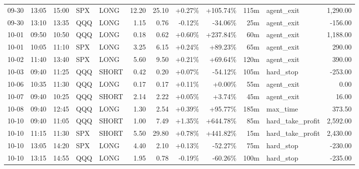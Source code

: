 \documentclass[11pt,a4paper,twoside]{article}
\begin{document}
\begin{center}
\begin{longtable}{>{\color{txtmain}}l l l l l r r r r r >{\color{txtmain}}l r}
09-30 & 13:05 & 15:00 & SPX & LONG & 12.20 & 25.10 & \textcolor{wingreen}{+0.27\%} & \textcolor{wingreen}{+105.74\%} & 115m & agent\_exit & \textcolor{wingreen}{1,290.00} \\
09-30 & 13:10 & 13:35 & QQQ & LONG & 1.15 & 0.76 & \textcolor{lossred}{-0.12\%} & \textcolor{lossred}{-34.06\%} & 25m & agent\_exit & \textcolor{lossred}{-156.00} \\
10-01 & 09:50 & 10:50 & QQQ & LONG & 0.18 & 0.62 & \textcolor{wingreen}{+0.60\%} & \textcolor{wingreen}{+237.84\%} & 60m & agent\_exit & \textcolor{wingreen}{1,188.00} \\
10-01 & 10:05 & 11:10 & SPX & LONG & 3.25 & 6.15 & \textcolor{wingreen}{+0.24\%} & \textcolor{wingreen}{+89.23\%} & 65m & agent\_exit & \textcolor{wingreen}{290.00} \\
10-02 & 11:40 & 13:40 & SPX & LONG & 5.60 & 9.50 & \textcolor{wingreen}{+0.21\%} & \textcolor{wingreen}{+69.64\%} & 120m & agent\_exit & \textcolor{wingreen}{390.00} \\
10-03 & 09:40 & 11:25 & QQQ & SHORT & 0.42 & 0.20 & \textcolor{wingreen}{+0.07\%} & \textcolor{lossred}{-54.12\%} & 105m & hard\_stop & \textcolor{lossred}{-253.00} \\
10-06 & 10:35 & 11:30 & QQQ & LONG & 0.17 & 0.17 & \textcolor{wingreen}{+0.11\%} & \textcolor{wingreen}{+0.00\%} & 55m & agent\_exit & \textcolor{wingreen}{0.00} \\
10-07 & 09:40 & 10:25 & QQQ & SHORT & 2.14 & 2.22 & \textcolor{wingreen}{+0.05\%} & \textcolor{wingreen}{+3.74\%} & 45m & agent\_exit & \textcolor{wingreen}{16.00} \\
10-08 & 09:40 & 12:45 & QQQ & LONG & 1.30 & 2.54 & \textcolor{wingreen}{+0.39\%} & \textcolor{wingreen}{+95.77\%} & 185m & max\_time & \textcolor{wingreen}{373.50} \\
10-10 & 09:40 & 11:05 & QQQ & SHORT & 1.00 & 7.49 & \textcolor{wingreen}{+1.35\%} & \textcolor{wingreen}{+644.78\%} & 85m & hard\_take\_profit & \textcolor{wingreen}{2,592.00} \\
10-10 & 11:15 & 11:30 & SPX & SHORT & 5.50 & 29.80 & \textcolor{wingreen}{+0.78\%} & \textcolor{wingreen}{+441.82\%} & 15m & hard\_take\_profit & \textcolor{wingreen}{2,430.00} \\
10-10 & 13:05 & 14:20 & SPX & LONG & 4.40 & 2.10 & \textcolor{wingreen}{+0.13\%} & \textcolor{lossred}{-52.27\%} & 75m & hard\_stop & \textcolor{lossred}{-230.00} \\
10-10 & 13:15 & 14:55 & QQQ & LONG & 1.95 & 0.78 & \textcolor{lossred}{-0.19\%} & \textcolor{lossred}{-60.26\%} & 100m & hard\_stop & \textcolor{lossred}{-235.00} \\

\end{longtable}
\end{center}
\end{document}
